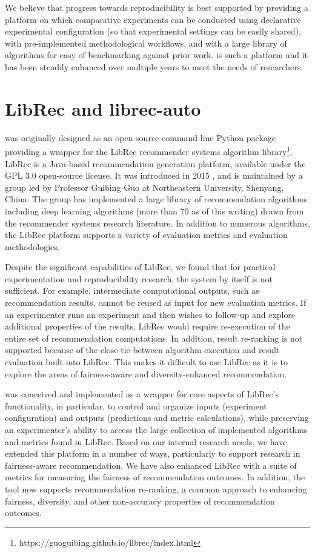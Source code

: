 We believe that progress towards reproducibility is best supported by providing a platform on which comparative experiments can be conducted using declarative experimental configuration (so that experimental settings can be easily shared), with pre-implemented methodological workflows, and with a large library of algorithms for easy of benchmarking against prior work. \libauto{} is such a platform and it has been steadily enhanced over multiple years to meet the needs of researchers.



\section{LibRec and librec-auto}
\libauto{} was originally designed as an open-source command-line Python package providing a wrapper for the LibRec recommender systems algorithm library\footnote{https://guoguibing.github.io/librec/index.html}. LibRec is a Java-based recommendation generation platform, available under the GPL 3.0 open-source license. It was introduced in 2015 \cite{guo2015librec}, and is maintained by a group led by Professor Guibing Guo at Northeastern University, Shenyang, China. The group has implemented a large library of recommendation algorithms including deep learning algorithms (more than 70 as of this writing) drawn from the recommender systems research literature. In addition to numerous algorithms, the LibRec platform supports a variety of evaluation metrics and evaluation methodologies.

Despite the significant capabilities of LibRec, we found that for practical experimentation and reproducibility research, the system by itself is not sufficient. For example, intermediate computational outputs, such as recommendation results, cannot be reused as input for new evaluation metrics. If an experimenter runs an experiment and then wishes to follow-up and explore additional properties of the results, LibRec would require re-execution of the entire set of recommendation computations. In addition, result re-ranking is not supported because of the close tie between algorithm execution and result evaluation built into LibRec. This makes it difficult to use LibRec as it is to explore the areas of fairness-aware and diversity-enhanced recommendation.

\libauto{} was conceived and implemented as a wrapper for core aspects of LibRec's functionality, in particular, to control and organize inputs (experiment configuration) and outputs (predictions and metric calculations), while preserving an experimenter's ability to access the large collection of implemented algorithms and metrics found in LibRec. Based on our internal research needs, we have extended this platform in a number of ways, particularly to support research in fairness-aware recommendation. We have also enhanced LibRec with a suite of metrics for measuring the fairness of recommendation outcomes. In addition, the tool now supports recommendation re-ranking, a common approach to enhancing fairness, diversity, and other non-accuracy properties of recommendation outcomes.

